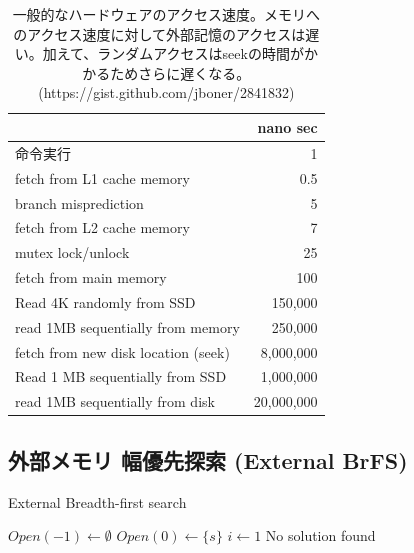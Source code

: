 \documentclass[10pt]{book}
\begin{document}
\begin{table}
\centering
\caption{一般的なハードウェアのアクセス速度。メモリへのアクセス速度に対して外部記憶のアクセスは遅い。加えて、ランダムアクセスはseekの時間がかかるためさらに遅くなる。 (https://gist.github.com/jboner/2841832)}
\label{tbl:latency}
\begin{tabular}{|l|r|}
		   & nano sec \\ \hline
	命令実行 & 1 \\
	fetch from L1 cache memory & 0.5 \\
	branch misprediction 		& 5 \\
	fetch from L2 cache memory & 7 \\
	mutex lock/unlock  			& 25 \\
	fetch from main memory  	& 100 \\
	Read 4K randomly from SSD         & 150,000 \\
	read 1MB sequentially from memory & 250,000 \\
	fetch from new disk location (seek) & 8,000,000 \\
	Read 1 MB sequentially from SSD		& 1,000,000 \\
	read 1MB sequentially from disk 	& 20,000,000 \\
	
\end{tabular}
\end{table}

\subsection{外部メモリ 幅優先探索 (External BrFS)}
\label{sec:external-brfs}


\cite{mehlhorn2002external}

\begin{algorithm}
\caption{External Breadth-first search}
\label{alg:external-brfs}
	$Open(-1) \leftarrow \emptyset$\;
	$Open(0) \leftarrow \{s\}$\;
	$i \leftarrow 1$\;
	\Return No solution found
\end{algorithm}
\end{document}
